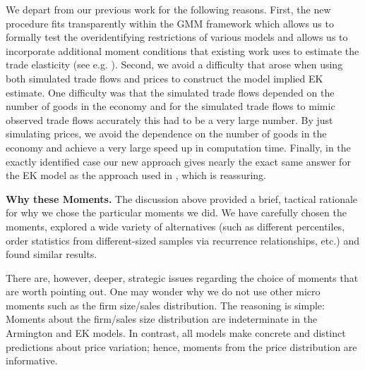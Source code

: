 \documentclass[12pt,dvips, ps2pdf]{article}
\begin{document}
We depart from our previous work for the following reasons. First, the new procedure fits transparently within the GMM framework which allows us to formally test the overidentifying restrictions of various models and allows us to incorporate additional moment conditions that existing work uses to estimate the trade elasticity (see e.g. \citet{caliendo2010}). Second, we avoid a difficulty that arose when using both simulated trade flows and prices to construct the model implied EK estimate. One difficulty was that the simulated trade flows depended on the number of goods in the economy and for the simulated trade flows to mimic observed trade flows accurately this had to be a very large number. By just simulating prices, we avoid the dependence on the number of goods in the economy and achieve a very large speed up in computation time. Finally, in the exactly identified case our new approach gives nearly the exact same answer for the EK model as the approach used in \citet{sw_jie}, which is reassuring.

\textbf{Why these Moments.} The discussion above provided a brief, tactical rationale for why we chose the particular moments we did. We have carefully chosen the moments, explored a wide variety of alternatives (such as different percentiles, order statistics from different-sized samples via recurrence relationships, etc.) and found similar results.

There are, however, deeper, strategic issues regarding the choice of moments that are worth pointing out. One may wonder why we do not use other micro moments such as the firm size/sales distribution. The reasoning is simple: Moments about the firm/sales size distribution are indeterminate in the Armington and EK models. In contrast, all models make concrete and distinct predictions about price variation; hence, moments from the price distribution are informative.
\end{document}

